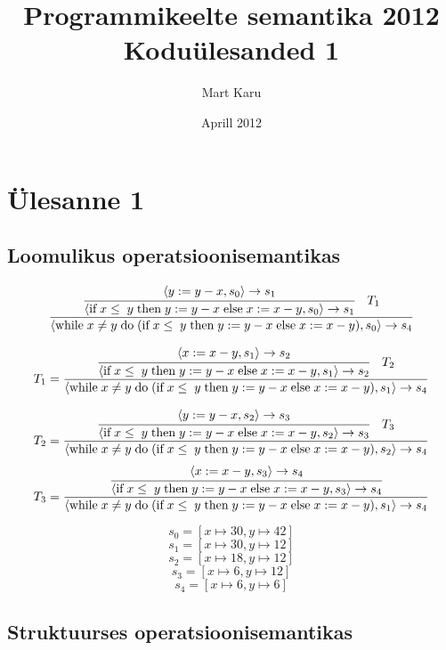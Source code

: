\documentclass[a4paper,oneside,draft]{article}
\begin{document}
\title{Programmikeelte semantika 2012\\
Koduülesanded 1}
\author{Mart Karu}
\date{Aprill 2012}
\maketitle
\section{Ülesanne 1}
\subsection{Loomulikus operatsioonisemantikas}

\[
  \frac{
    \cfrac{
      \langle y := y-x, s_0 \rangle \rightarrow s_1
    }{
      \langle 
        \textrm{if} \; x \leq \; y \;
          \textrm{then} \; y := y-x \;
          \textrm{else} \;  x:= x-y
        , s_0
      \rangle \rightarrow s_1
    }
    \quad
    T_1
  }{
    \langle 
    \textrm{while} \; x \neq  y \; \textrm{do} \;
      (\textrm{if} \; x \leq \; y \;
        \textrm{then} \; y := y-x \;
        \textrm{else} \;  x:= x-y )
      , s_0
    \rangle \rightarrow s_4
  }
\]

\[
  T_1 = \frac{
    \cfrac{
      \langle x := x-y, s_1 \rangle \rightarrow s_2
    }{
      \langle 
        \textrm{if} \; x \leq \; y \;
          \textrm{then} \; y := y-x \;
          \textrm{else} \;  x:= x-y
        , s_1
      \rangle \rightarrow s_2
    }
    \quad
    T_2
  }{
    \langle 
    \textrm{while} \; x \neq  y \; \textrm{do} \;
      (\textrm{if} \; x \leq \; y \;
        \textrm{then} \; y := y-x \;
        \textrm{else} \;  x:= x-y )
      , s_1
    \rangle \rightarrow s_4
  }
\]

\[
  T_2 = \frac{
    \cfrac{
      \langle y := y-x, s_2 \rangle \rightarrow s_3
    }{
      \langle 
        \textrm{if} \; x \leq \; y \;
          \textrm{then} \; y := y-x \;
          \textrm{else} \;  x:= x-y
        , s_2
      \rangle \rightarrow s_3
    }
    \quad
    T_3
  }{
    \langle 
    \textrm{while} \; x \neq  y \; \textrm{do} \;
      (\textrm{if} \; x \leq \; y \;
        \textrm{then} \; y := y-x \;
        \textrm{else} \;  x:= x-y )
      , s_2
    \rangle \rightarrow s_4
  }
\]
\[
  T_3 = \frac{
    \cfrac{
      \langle x := x-y, s_3 \rangle \rightarrow s_4
    }{
      \langle 
        \textrm{if} \; x \leq \; y \;
          \textrm{then} \; y := y-x \;
          \textrm{else} \;  x:= x-y
        , s_3
      \rangle \rightarrow s_4
    }
  }{
    \langle 
    \textrm{while} \; x \neq  y \; \textrm{do} \;
      (\textrm{if} \; x \leq \; y \;
        \textrm{then} \; y := y-x \;
        \textrm{else} \;  x:= x-y )
      , s_1
    \rangle \rightarrow s_4
  }
\]

\[s_0 = [x \mapsto 30, y \mapsto 42]\]
\[s_1 = [x \mapsto 30, y \mapsto 12]\]
\[s_2 = [x \mapsto 18, y \mapsto 12]\]
\[s_3 = [x \mapsto 6, y \mapsto 12]\]
\[s_4 = [x \mapsto 6, y \mapsto 6]\]

\subsection{Struktuurses operatsioonisemantikas}
\end{document}
